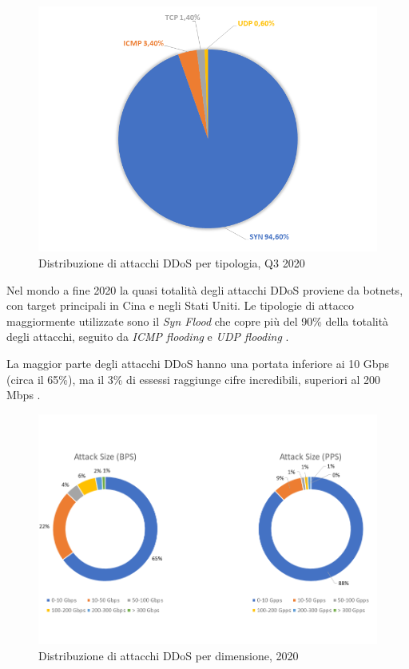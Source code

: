 \begin{figure}[h]
    \includegraphics[width=\hsize]{images/introduzione/tesi_distribuzione_tipologia_attacchi.png}
    \caption{Distribuzione di attacchi DDoS per tipologia, Q3 2020 \cite{ddos_kaspersky_q3_2020}}
    \centering
\end{figure}

Nel mondo a fine 2020 la quasi totalità degli attacchi DDoS proviene da botnets, con target principali in Cina e negli Stati Uniti. Le tipologie di attacco maggiormente utilizzate sono il \emph{Syn Flood} che copre più del 90\% della totalità degli attacchi, seguito da \emph{ICMP flooding} e \emph{UDP flooding} \cite{ddos_kaspersky, ddos_kaspersky_q3_2020}.


La maggior parte degli attacchi DDoS hanno una portata inferiore ai 10 Gbps (circa il 65\%), ma il 3\% di essessi raggiunge cifre incredibili, superiori al 200 Mbps \cite{imperva_ddos_report}.

\begin{figure}[h]
    \includegraphics[width=\hsize]{images/introduzione/attacks_size_2.png}
    \caption{Distribuzione di attacchi DDoS per dimensione, 2020 \cite{imperva_ddos_report}}
    \centering
\end{figure}


